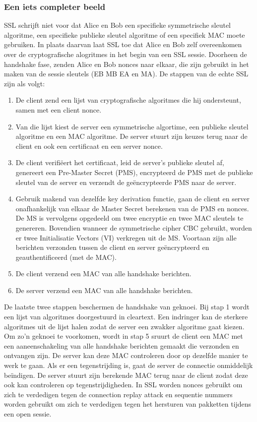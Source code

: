 \clearpage

\subsubsection{Een iets completer beeld}


SSL schrijft niet voor dat Alice en Bob een specifieke symmetrische sleutel algoritme, een specifieke publieke sleutel algoritme of een specifiek MAC moete gebruiken. In plaats daarvan laat SSL toe dat Alice en Bob zelf overeenkomen over de cryptografische alogritmes in het begin van een SSL sessie. Doorheen de handshake fase, zenden Alice en Bob nonces naar elkaar, die zijn gebruikt in het maken van de sessie sleutels (EB MB EA en MA). De stappen van de echte SSL zijn als volgt:
\begin{enumerate}

\item De client zend een lijst van cryptografische algoritmes die hij ondersteunt, samen met een client nonce.
\item Van die lijst kiest de server een symmetrische algortime, een publieke sleutel algoritme en een MAC algoritme. De server stuurt zijn keuzes terug naar de client en ook een certificaat en een server nonce.
\item De client verifiëert het certificaat, leid de server’s publieke sleutel af, genereert een Pre-Master Secret (PMS), encrypteerd de PMS met de publieke sleutel van de server en verzendt de geëncrypteerde PMS naar de server.
\item Gebruik makend van dezelfde key derivation functie, gaan de client en server onafhankelijk van elkaar de Master Secret berekenen van de PMS en nonces. De MS is vervolgens opgedeeld om twee encryptie en twee MAC sleutels te genereren. Bovendien wanneer de symmetrische cipher CBC gebruikt, worden er twee Initialisatie Vectors (VI) verkregen uit de MS. Voortaan zijn alle berichten verzonden tussen de client en server geëncrypteerd en geauthentificeerd (met de MAC).
\item De client verzend een MAC van alle handshake berichten.
\item De server verzend een MAC van alle handshake berichten.
\end{enumerate}
De laatste twee stappen beschermen de handshake van geknoei.
Bij stap 1 wordt een lijst van algoritmes doorgestuurd in cleartext. Een indringer kan de sterkere algoritmes uit de lijst halen zodat de server een zwakker algoritme gaat kiezen. Om zo’n geknoei te voorkomen, wordt in stap 5 sruurt de client een MAC met een aaneenschakeling van alle handshake berichten gemaakt die verzonden en ontvangen zijn. De server kan deze MAC controleren door op dezelfde manier te werk te gaan. Als er een tegenstrijding is, gaat de server de connectie onmiddelijk beïndigen. De server stuurt zijn berekende MAC terug naar de client zodat deze ook kan controleren op tegenstrijdigheden.
In SSL worden nonces gebruikt om zich te verdedigen tegen de connection replay attack en sequentie nummers worden gebruikt om zich te verdedigen tegen het hersturen van pakketten tijdens een open sessie.

